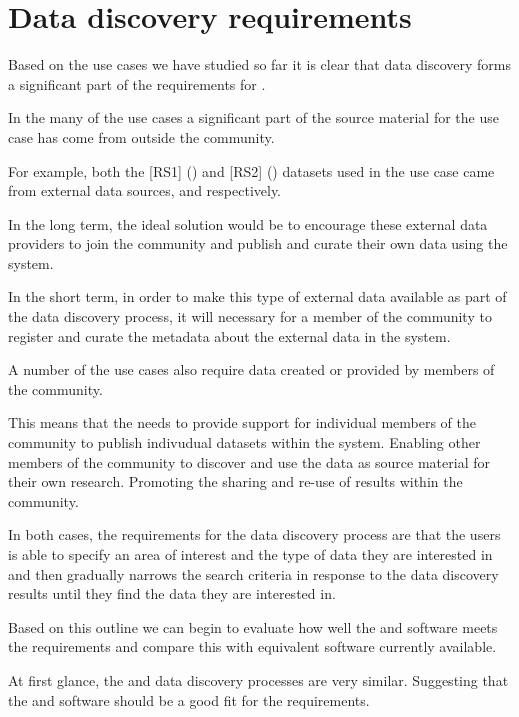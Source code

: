\documentclass{article}
\begin{document}
\section{Data discovery requirements}

Based on the \cite{trop} use cases we have studied so far it is clear that data discovery
forms a significant part of the requirements for \cite{trop}.

In the many of the use cases a significant part of the source material for the use case has come
from outside the \cite{trop} community.

For example, both the [RS1] (\cite{saatchi-2011}) and [RS2] (\cite{baccini-2012}) datasets used in
the \cite{mitchard-2014} use case came from external data sources, 
and  respectively.

In the long term, the ideal solution would be to encourage these external data providers to join
the \cite{trop} community and publish and curate their own data using the \cite{trop}
system.

In the short term, in order to make this type of external data available as part of the \cite{trop}
data discovery process, it will necessary for a member of the \cite{trop} community to register
and curate the metadata about the external data in the \cite{trop} system.

A number of the \cite{trop} use cases also require data created or provided by members of the
\cite{trop} community.

This means that the \cite{trop} needs to provide support for individual members of the
\cite{trop} community to publish indivudual datasets within the \cite{trop} system.
Enabling other members of the \cite{trop} community to discover and use the data as
source material for their own research.
Promoting the sharing and re-use of results within the \cite{trop} community.

In both cases, the requirements for the data discovery process are that the users is able to specify
an area of interest and the type of data they are interested in and then gradually narrows the search
criteria in response to the data discovery results until they find the data they are interested in.

Based on this outline we can begin to evaluate how well the \cite{ivoa} and \cite{astro} software
meets the \cite{trop} requirements and compare this with equivalent \cite{gis} software
currently available.

At first glance, the \cite{ivoa} and \cite{trop} data discovery processes are very similar.
Suggesting that the \cite{ivoa} and \cite{astro} software should be a good fit for the \cite{trop}
requirements.
\end{document}
